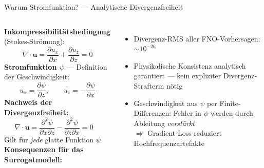 \documentclass[aspectratio=169, 10pt]{beamer}
\begin{document}
\begin{frame}{Warum Stromfunktion? — Analytische Divergenzfreiheit}
\begin{columns}
\textbf{Inkompressibilitätsbedingung} (Stokes-Strömung):
\[
  \nabla \cdot \mathbf{u} = \frac{\partial u_x}{\partial x} + \frac{\partial u_z}{\partial z} = 0
\]
\vspace{4pt}
\textbf{Stromfunktion $\psi$} — Definition der Geschwindigkeit:
\[
  u_x = \frac{\partial \psi}{\partial z}, \qquad
  u_z = -\frac{\partial \psi}{\partial x}
\]
\vspace{4pt}
\textbf{Nachweis der Divergenzfreiheit:}
\[
  \nabla \cdot \mathbf{u}
    = \frac{\partial^2 \psi}{\partial x \partial z}
    - \frac{\partial^2 \psi}{\partial z \partial x}
    = 0 \quad
\]
Gilt für \emph{jede} glatte Funktion $\psi$
\textbf{Konsequenzen für das Surrogatmodell:}
\begin{itemize}
  \item Divergenz-RMS aller FNO-Vorhersagen: $\sim10^{-26}$
  \item Physikalische Konsistenz analytisch garantiert —
        kein expliziter Divergenz-Strafterm nötig
  \item Geschwindigkeit aus $\psi$ per Finite-Differenzen:
        Fehler in $\psi$ werden durch Ableitung \emph{verstärkt}\\
        $\Rightarrow$ Gradient-Loss reduziert Hochfrequenzartefakte
\end{itemize}
\end{columns}
\end{frame}
\end{document}
